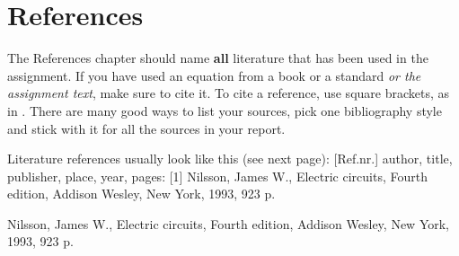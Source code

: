 \chapter{References}

 The References chapter should name \textbf{all} literature that has been used in the assignment. If you have used an equation from a book or a standard {\em or the assignment text}, make sure to cite it. To cite a reference, use square brackets, as in \cite{Nilsson}. There are many good ways to list your sources, pick one bibliography style and stick with it for all the sources in your report. 

Literature references usually look like this (see next page): {[}Ref.nr.{]} author, title, publisher, place, year, pages: {[}1{]} Nilsson, James W., Electric circuits, Fourth edition, Addison Wesley, New York, 1993, 923 p.

\begin{thebibliography}{1}
Nilsson, James W., Electric circuits, Fourth edition, Addison Wesley, New York, 1993, 923 p. 

\end{thebibliography}
\appendix


